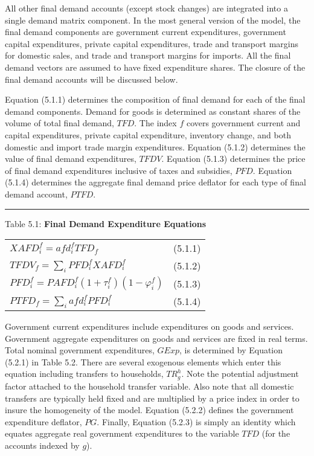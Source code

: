\documentclass[12pt]{article}
\begin{document}
All other final demand accounts (except stock changes) are integrated into a single demand matrix component. In the most general version of the model, the final demand components are government current expenditures, government capital expenditures, private capital expenditures, trade and transport margins for domestic sales, and trade and transport margins for imports. All the final demand vectors are assumed to have fixed expenditure shares. The closure of the final demand accounts will be discussed below.

Equation (5.1.1) determines the composition of final demand for each of the final demand components. Demand for goods is determined as constant shares of the volume of total final demand, $TFD$. The index $f$ covers government current and capital expenditures, private capital expenditure, inventory change, and both domestic and import trade margin expenditures. Equation (5.1.2) determines the value of final demand expenditures, $TFDV$. Equation (5.1.3) determines the price of final demand expenditures inclusive of taxes and subsidies, $PFD$. Equation (5.1.4) determines the aggregate final demand price deflator for each type of final demand account, $PTFD$.

\newpage

\noindent\rule{\linewidth}{0.4pt}
\begin{center}
\begin{large}
{\centering Table 5.1: \textbf{Final Demand Expenditure Equations} \par}

\begin{tabular}{>{\raggedright}p{} l}

$X\!AFD^f_i = afd^f_iTFD_f$ & (5.1.1)\\[15pt]

$TFDV_f = \displaystyle \sum_i PFD^f_i X\!AFD^f_i$ & (5.1.2)\\[15pt]

$PFD^f_i = PAFD^f_i\left(1 + \tau^f_i\right)\left(1-\varphi^f_i\right)$ & (5.1.3)\\[15pt]

$PTFD_f = \displaystyle \sum_i afd^f_iPFD^f_i$ & (5.1.4) \\[20pt]

\hline
\end{tabular}
\end{large}
\end{center}

Government current expenditures include expenditures on goods and services. Government aggregate expenditures on goods and services are fixed in real terms. Total nominal government expenditures, $GExp$, is determined by Equation (5.2.1) in Table 5.2. There are several exogenous elements which enter this equation including transfers to households, $TR_g^h$. Note the potential adjustment factor attached to the household transfer variable. Also note that all domestic transfers are typically held fixed and are multiplied by a price index in order to insure the homogeneity of the model. Equation (5.2.2) defines the government expenditure deflator, $PG$. Finally, Equation (5.2.3) is simply an identity which equates aggregate real government expenditures to the variable $TFD$ (for the accounts indexed by $g$).
\end{document}

